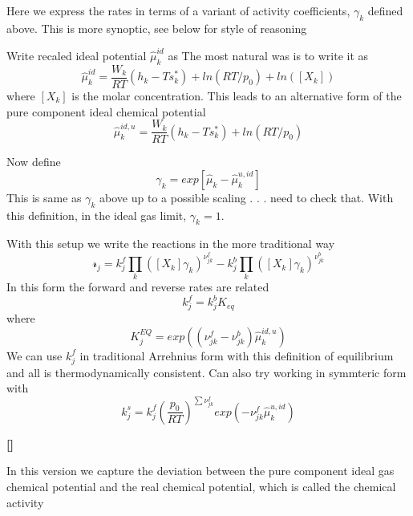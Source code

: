 \documentclass[11pt]{article}
\newcommand{\jbb}[1]{{\bf[{\color{red}{JBB:  #1}}]}}
\begin{document}
Here we express the rates in terms of a variant of activity coefficients, $\gamma_k$ defined above.
This is more synoptic, see below for style of reasoning

Write recaled ideal potential  $\hat{\mu}_k^{id}$ as
The most natural was is to write it as
\begin{equation}
\hat{\mu}_k^{id} = \frac{W_k}{R T} (h_k - T s_k^* )+ ln(RT/p_0) + ln([X_k])
\end{equation}
where $[X_k]$ is the molar concentration.
This leads to an alternative form of the pure component ideal chemical potential
\begin{equation}
\hat{\mu}_k^{id,u} = \frac{W_k}{R T} (h_k - T s_k^* )+ ln(RT/p_0) 
\label{eq:chem_uid_conc}
\end{equation}

Now define
\begin{equation}
\gamma_k = exp[\hat{\mu}_k - \hat{\mu}_k^{u,id}]
\label{eq:deviate_ideal}
\end{equation}
This is same as $\gamma_k$ above up to a possible scaling . . . need to check that.
With this definition, in the ideal gas limit, $\gamma_k = 1$.

With this setup we write the reactions in the more traditional way
\begin{equation}
\mathcal{r}_j = k_j^f \prod_k ([X_k]\gamma_k)^{\nu_{jk}^f}
- k_j^b \prod_k ([X_k] \gamma_k)^{\nu_{jk}^b}
\end{equation}
In this form the forward and reverse rates are related
\begin{equation}
 k_j^f = k_j^b K_{eq}
\end{equation}
where
\begin{equation}
K_j^{EQ} = 
exp( (\nu_{jk}^f - \nu_{jk}^b) \hat{\mu}_k^{id,u})
\label{eq:kin_equil_trad}
\end{equation}
We can use $k_j^f$ in traditional Arrehnius form with this definition of equilibrium and all is thermodynamically
consistent.  Can also try working in symmteric form with
\[
k_j^s =  k_j^f 
\left ( \frac{p_0}{R T}  \right )^{\sum \nu_{jk}^f }exp( -\nu_{jk}^f \hat{\mu}_k^{u,id})
\]

\jbb{old Stuff}

In this version we capture the deviation between the pure component ideal gas chemical potential and
the real chemical potential, which is called the chemical activity
\end{document}
